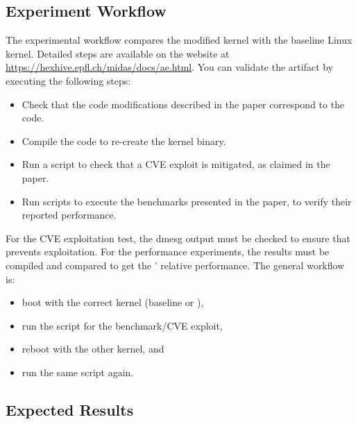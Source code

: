 \subsection{Experiment Workflow}

The experimental workflow compares the modified \midas{} kernel with
the baseline Linux kernel.
Detailed steps are available on the website at 
\url{https://hexhive.epfl.ch/midas/docs/ae.html}.
You can validate the artifact by executing the following steps:
\begin{itemize}
  \item Check that the code modifications described in the paper correspond 
  to the code.
  \item Compile the code to re-create the kernel binary.
  \item Run a script to check that a CVE exploit is mitigated, as claimed 
  in the paper.
  \item Run scripts to execute the benchmarks presented in the paper, 
  to verify their reported performance.
\end{itemize}

For the CVE exploitation test, the dmesg output must be checked 
to ensure that \midas{} prevents exploitation.
For the performance experiments, the results must be compiled 
and compared to get the \midas{}' relative performance.
The general workflow is:
\begin{itemize}
  \item boot with the correct kernel (baseline or \midas{}),
  \item run the script for the benchmark/CVE exploit,
  \item reboot with the other kernel, and 
  \item run the same script again.
\end{itemize}

\balance
\subsection{Expected Results}


